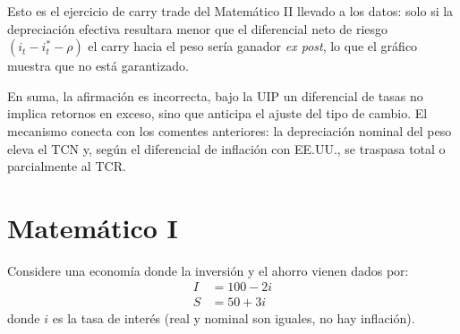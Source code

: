 \documentclass[a4paper]{article}
\begin{document}
\begin{enumerate}
\begin{solution}
    Esto es el ejercicio de carry trade del Matem\'atico II llevado a los datos: solo si la depreciaci\'on efectiva resultara menor que el diferencial neto de riesgo \( (i_t - i_t^* - \rho) \) el carry hacia el peso ser\'ia ganador \emph{ex post}, lo que el gr\'afico muestra que no est\'a garantizado.

    En suma, la afirmaci\'on es incorrecta, bajo la UIP un diferencial de tasas no implica retornos en exceso, sino que anticipa el ajuste del tipo de cambio. El mecanismo conecta con los comentes anteriores: la depreciaci\'on nominal del peso eleva el TCN y, seg\'un el diferencial de inflaci\'on con EE.UU., se traspasa total o parcialmente al TCR.
    \end{solution}

\end{enumerate}

\section*{Matem\'atico I}

Considere una econom\'ia donde la inversi\'on y el ahorro vienen dados por:
\begin{align}
    I &= 100 - 2i  \\
    S &= 50 + 3i
\end{align}
donde $i$ es la tasa de inter\'es (real y nominal son iguales, no hay inflaci\'on).
\end{document}
